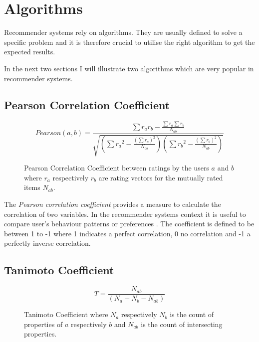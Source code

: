 \section{Algorithms}

Recommender systems rely on algorithms. They are usually defined to solve a specific problem and it is therefore crucial to utilise the right algorithm to get the expected results.

In the next two sections I will illustrate two algorithms which are very popular in recommender systems.

\subsection{Pearson Correlation Coefficient}

\begin{figure}[ht]
    \[Pearson(a,b) = \frac{\sum r_ar_b - \frac{\sum r_a \sum r_b}{N_{ab}}}{\sqrt{(\sum {r_a}^{2} - \frac{(\sum r_a)^{2}}{N_{ab}})(\sum {r_b}^{2} - \frac{(\sum r_b)^{2}}{N_{ab}})}}\]
    \caption[Pearson Correlation Coefficient]{Pearson Correlation Coefficient between ratings by the users \(a\) and \(b\) where \(r_a\) respectively \(r_b\) are rating vectors for the mutually rated items \(N_{ab}\).}
    \label{fig:pearson}
\end{figure}

The \textit{Pearson correlation coefficient} provides a measure to calculate the correlation of two variables. In the recommender systems context it is useful to compare user's behaviour patterns or preferences \cite{segaran07}. The coefficient is defined to be between 1 to -1 where 1 indicates a perfect correlation, 0 no correlation and -1 a perfectly inverse correlation.

\subsection{Tanimoto Coefficient}

\begin{figure}[ht]
    \[T = \frac{N_{ab}}{(N_a + N_b - N_{ab})}\]
    \caption[Tanimoto Coefficient]{Tanimoto Coefficient where \(N_a\) respectively \(N_b\) is the count of properties of \(a\) respectively \(b\) and \(N_{ab}\) is the count of intersecting properties.}
    \label{fig:tanimoto}
\end{figure}

